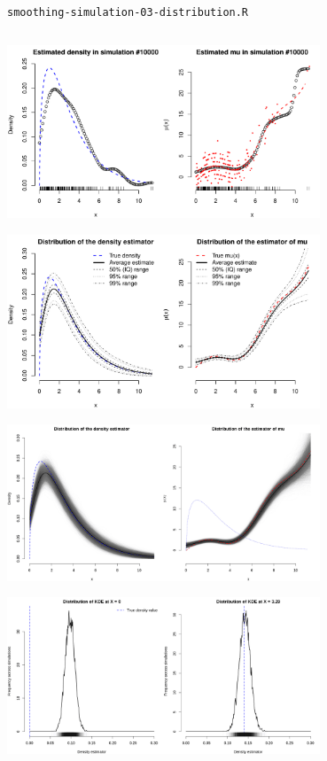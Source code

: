 \documentclass[11pt, a4paper]{article}
\begin{document}
\newpage
\centerline{\texttt{smoothing-simulation-03-distribution.R}}
\inputminted[baselinestretch=0.9, fontsize=\footnotesize, breaklines, linenos]{R}{smoothing-simulation-03-distribution.R}

\begin{center}
\includegraphics[width=0.7\textwidth]{output/30-estimation-example.pdf}

\includegraphics[width=0.7\textwidth]{output/31-estimator-bands.pdf}

\includegraphics[width=0.7\textwidth]{output/32-estimation-lines.png}

\includegraphics[width=0.7\textwidth]{output/33-density-estimator-distribution.png}
\end{center}
\end{document}
